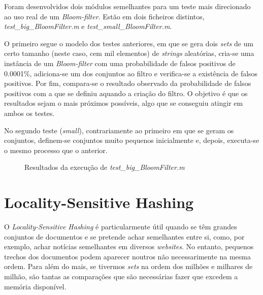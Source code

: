 \documentclass[a4paper,11pt,openright,oneside]{report}
\begin{document}
Foram desenvolvidos dois módulos semelhantes para um teste mais direcionado ao uso real de um \textit{Bloom-filter}. Estão em dois ficheiros distintos, \textit{test\_big\_BloomFilter.m} e \textit{test\_small\_BloomFilter.m}.

O primeiro segue o modelo dos testes anteriores, em que se gera dois \textit{sets} de um certo tamanho (neste caso, cem mil elementos) de \textit{strings} aleatórias, cria-se uma instância de um \textit{Bloom-filter} com uma probabilidade de falsos positivos de 0.0001\%, adiciona-se um dos conjuntos ao filtro e verifica-se a existência de falsos positivos. Por fim, compara-se o resultado observado da probabilidade de falsos positivos com a que se definiu aquando a criação do filtro. O objetivo é que os resultados sejam o mais próximos possíveis, algo que se conseguiu atingir em ambos os testes.

No segundo teste (\textit{small}), contrariamente ao primeiro em que se geram os conjuntos, definem-se conjuntos muito pequenos inicialmente e, depois, executa-se o mesmo processo que o anterior.

\begin{figure}[ht]	
\center
{}
\caption{Resultados da execução de \textit{test\_big\_BloomFilter.m}}
\label{fig:testbigbloom}
\end{figure}


\chapter{Locality-Sensitive Hashing}
\label{chap.lsh}

O \textit{Locality-Sensitive Hashing} é particularmente útil quando se têm grandes conjuntos de documentos e se pretende achar semelhantes entre si, como, por exemplo, achar notícias semelhantes em diversos \textit{websites}. No entanto, pequenos trechos dos documentos podem aparecer noutros não necessarimente na mesma ordem. Para além do mais, se tivermos \textit{sets} na ordem dos milhões e milhares de milhão, são tantas as comparações que são necessárias fazer que excedem a memória disponível.
\end{document}
